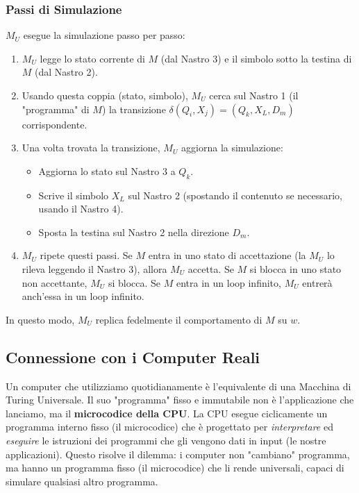 \documentclass[a4paper, 11pt]{book} %
\theoremstyle{definition}
\begin{document}
\subsubsection{Passi di Simulazione}
$M_U$ esegue la simulazione passo per passo:
\begin{enumerate}
    \item $M_U$ legge lo stato corrente di $M$ (dal Nastro 3) e il simbolo sotto la testina di $M$ (dal Nastro 2).
    \item Usando questa coppia (stato, simbolo), $M_U$ cerca sul Nastro 1 (il "programma" di $M$) la transizione $\delta(Q_i, X_j) = (Q_k, X_L, D_m)$ corrispondente.
    \item Una volta trovata la transizione, $M_U$ aggiorna la simulazione:
    \begin{itemize}
        \item Aggiorna lo stato sul Nastro 3 a $Q_k$.
        \item Scrive il simbolo $X_L$ sul Nastro 2 (spostando il contenuto se necessario, usando il Nastro 4).
        \item Sposta la testina sul Nastro 2 nella direzione $D_m$.
    \end{itemize}
    \item $M_U$ ripete questi passi. Se $M$ entra in uno stato di accettazione (la $M_U$ lo rileva leggendo il Nastro 3), allora $M_U$ accetta. Se $M$ si blocca in uno stato non accettante, $M_U$ si blocca. Se $M$ entra in un loop infinito, $M_U$ entrerà anch'essa in un loop infinito.
\end{enumerate}
In questo modo, $M_U$ replica fedelmente il comportamento di $M$ su $w$.

\subsection{Connessione con i Computer Reali}

Un computer che utilizziamo quotidianamente è l'equivalente di una Macchina di Turing Universale. Il suo "programma" fisso e immutabile non è l'applicazione che lanciamo, ma il \textbf{microcodice della CPU}. La CPU esegue ciclicamente un programma interno fisso (il microcodice) che è progettato per \textit{interpretare} ed \textit{eseguire} le istruzioni dei programmi che gli vengono dati in input (le nostre applicazioni). Questo risolve il dilemma: i computer non "cambiano" programma, ma hanno un programma fisso (il microcodice) che li rende universali, capaci di simulare qualsiasi altro programma.
\end{document}
